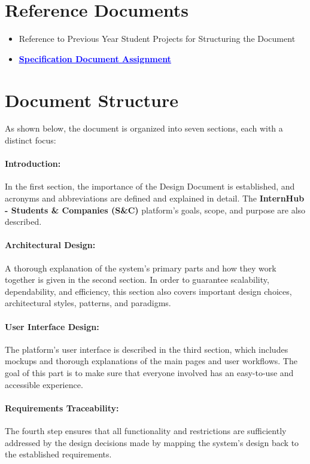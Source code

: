 \section{Reference Documents}
\label{sec:reference_documents}%
\begin{itemize}
    \item Reference to Previous Year Student Projects for Structuring the Document
    \item \href{https://github.com/JhaBhatiaSharma/JhaBhatiaSharma/tree/main/RASD\%20Doc}{\textbf{\textcolor{blue}{\underline{Specification Document Assignment}}}}
\end{itemize}

\section{Document Structure}
\label{sec:document_structure}%
As shown below, the document is organized into seven sections, each with a distinct focus:

\paragraph{Introduction:} In the first section, the importance of the Design Document is established, and acronyms and abbreviations are defined and explained in detail. The \textbf{InternHub - Students \& Companies (S\&C)} platform's goals, scope, and purpose are also described.

\paragraph{Architectural Design:} A thorough explanation of the system's primary parts and how they work together is given in the second section. In order to guarantee scalability, dependability, and efficiency, this section also covers important design choices, architectural styles, patterns, and paradigms.

\paragraph{User Interface Design:} The platform's user interface is described in the third section, which includes mockups and thorough explanations of the main pages and user workflows. The goal of this part is to make sure that everyone involved has an easy-to-use and accessible experience.

\paragraph{Requirements Traceability:} The fourth step ensures that all functionality and restrictions are sufficiently addressed by the design decisions made by mapping the system's design back to the established requirements.

